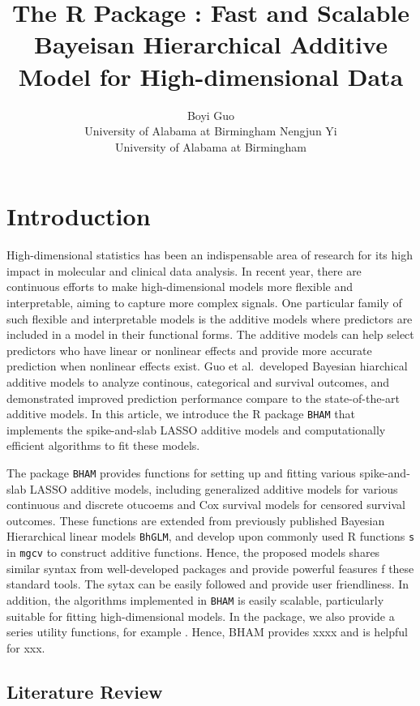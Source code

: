 \documentclass[
]{jss}
\author{
Boyi Guo\\University of Alabama at Birmingham \And Nengjun
Yi\\University of Alabama at Birmingham
}
\title{The R Package \pkg{BHAM}: Fast and Scalable Bayeisan Hierarchical
Additive Model for High-dimensional Data}
\begin{document}
\newcommand{\pr}{\text{Pr}}
\newcommand{\bs}[1]{\boldsymbol{#1}}
\newcommand{\tp}{*}
\newcommand{\simiid}{\overset{\text{iid}}{\sim}}

\section{Introduction}

High-dimensional statistics has been an indispensable area of research
for its high impact in molecular and clinical data analysis. In recent
year, there are continuous efforts to make high-dimensional models more
flexible and interpretable, aiming to capture more complex signals. One
particular family of such flexible and interpretable models is the
additive models where predictors are included in a model in their
functional forms. The additive models can help select predictors who
have linear or nonlinear effects and provide more accurate prediction
when nonlinear effects exist. Guo et al.~developed Bayesian hiarchical
additive models to analyze continous, categorical and survival outcomes,
and demonstrated improved prediction performance compare to the
state-of-the-art additive models. In this article, we introduce the R
package \texttt{BHAM} that implements the spike-and-slab LASSO additive
models and computationally efficient algorithms to fit these models.

The package \texttt{BHAM} provides functions for setting up and fitting
various spike-and-slab LASSO additive models, including generalized
additive models for various continuous and discrete otucoems and Cox
survival models for censored survival outcomes. These functions are
extended from previously published Bayesian Hierarchical linear models
\texttt{BhGLM}, and develop upon commonly used R functions \texttt{s} in
\texttt{mgcv} to construct additive functions. Hence, the proposed
models shares similar syntax from well-developed packages and provide
powerful feasures f these standard tools. The sytax can be easily
followed and provide user friendliness. In addition, the algorithms
implemented in \texttt{BHAM} is easily scalable, particularly suitable
for fitting high-dimensional models. In the package, we also provide a
series utility functions, for example . Hence, BHAM provides xxxx and is
helpful for xxx.

\subsection{Literature Review}
\end{document}
